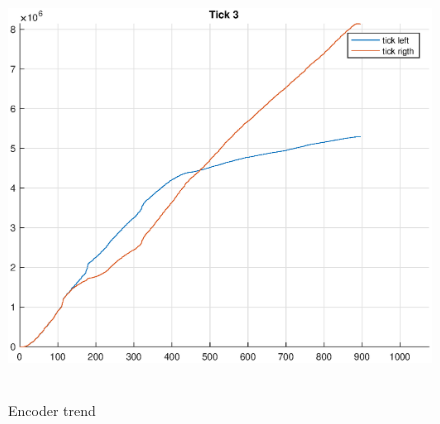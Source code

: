 \begin{figure}[!h]
   {\includegraphics[scale=0.18]{tick_dataset_3.eps}} \,
\caption{Encoder trend}
\label{fig:tickPlot}
\end{figure}